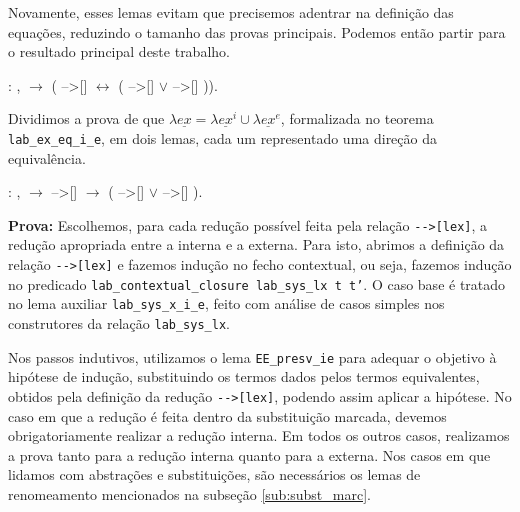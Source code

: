 Novamente, esses lemas evitam que precisemos adentrar na definição das
equações, reduzindo o tamanho das provas principais. Podemos então partir para
o resultado principal deste trabalho.

\bigskip

 :
\coqdockw{\ensuremath{\forall}}  ,
  \ensuremath{\rightarrow} (
-->[]  \ensuremath{\leftrightarrow} (
-->[]  \ensuremath{\lor} 
-->[] )).\coqdoceol

\bigskip

Dividimos a prova de que $\lambda \underline{ex} =
\lambda \underline{ex}^i \cup \lambda \underline{ex}^e$, formalizada no teorema
\texttt{lab\_ex\_eq\_i\_e}, em dois lemas, cada um representado uma direção da
equivalência.

\bigskip

\coqdocnoindent {} :
\coqdockw{\ensuremath{\forall}}  ,
  \ensuremath{\rightarrow} 
-->[]  \ensuremath{\rightarrow} (
-->[]  \ensuremath{\lor} 
-->[] ).\coqdoceol

\begin{addmargin}[1em]{2em}
\textbf{Prova:} Escolhemos, para cada redução possível feita pela relação
\texttt{-{}->[lex]}, a redução apropriada entre a interna e a externa.  Para
isto, abrimos a definição da relação \texttt{-{}->[lex]} e fazemos indução no
fecho contextual, ou seja, fazemos indução no predicado
\texttt{lab\_contextual\_closure lab\_sys\_lx t t'}. O caso base é tratado no
lema auxiliar \texttt{lab\_sys\_x\_i\_e}, feito com análise de casos simples nos
construtores da relação \texttt{lab\_sys\_lx}. 

Nos passos indutivos, utilizamos o lema \texttt{EE\_presv\_ie} para adequar o
objetivo à hipótese de indução, substituindo os termos dados pelos termos
equivalentes, obtidos pela definição da redução \texttt{-{}->[lex]}, podendo assim
aplicar a hipótese. No caso em que a redução é feita dentro da substituição
marcada, devemos obrigatoriamente realizar a redução interna. Em todos os outros
casos, realizamos a prova tanto para a redução interna quanto para a externa.
Nos casos em que lidamos com abstrações e substituições, são necessários os
lemas de renomeamento mencionados na subseção \ref{sub:subst_marc}.
\end{addmargin}

